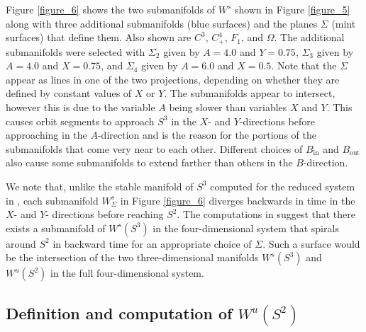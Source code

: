 \documentclass{ws-ijbc}
\begin{document}
Figure \ref{figure_6} shows the two submanifolds of $W^{s}$ shown in Figure \ref{figure_5} along with three additional submanifolds (blue surfaces) and the planes $\Sigma$ (mint surfaces) that define them.  Also shown are $C^3$, $C^4_+$, $F_1$, and $\Omega$.  The additional submanifolds were selected with $\Sigma_2$ given by $A=4.0$ and $Y=0.75$, $\Sigma_3$ given by $A=4.0$ and $X=0.75$, and $\Sigma_4$ given by $A=6.0$ and $X=0.5$.  Note that the $\Sigma$ appear as lines in one of the two projections, depending on whether they are defined by constant values of $X$ or $Y$.  The submanifolds appear to intersect, however this is due to the variable $A$ being slower than variables $X$ and $Y$.  This causes orbit segments to approach $S^3$ in the $X$- and $Y$-directions before approaching in the $A$-direction and is the reason for the portions of the submanifolds that come very near to each other.  Different choices of $B_{\text{in}}$ and $B_{\text{out}}$ also cause some submanifolds to extend farther than others in the $B$-direction.
    
We note that, unlike the stable manifold of $S^3$ computed for the reduced system in \cite{QSSA}, each submanifold $W^{s}_{\Sigma}$ in Figure \ref{figure_6} diverges backwards in time in the $X$- and $Y$- directions before reaching $S^2$.  The computations in \cite{QSSA} suggest that there exists a  submanifold of $W^s(S^3)$ in the four-dimensional system that spirals around $S^2$ in backward time for an appropriate choice of $\Sigma$.  Such a surface would be the intersection of the two three-dimensional manifolds $W^s(S^3)$ and $W^u(S^2)$ in the full four-dimensional system.  

\subsection{Definition and computation of $W^{u}(S^2)$}  
\end{document}
